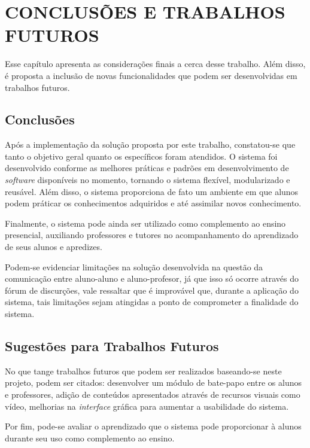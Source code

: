 \chapter{CONCLUSÕES E TRABALHOS FUTUROS}
\label{chap:conclusoes-e-trabalhos-futuros}

Esse capítulo apresenta as considerações finais a cerca desse trabalho. Além disso, é proposta a inclusão de novas funcionalidades que podem ser desenvolvidas em trabalhos futuros.

\section{Conclusões}

Após a implementação da solução proposta por este trabalho, constatou-se que tanto o objetivo geral quanto os específicos foram atendidos. O sistema foi desenvolvido conforme as melhores práticas e padrões em desenvolvimento de \textit{software} disponíveis no momento, tornando o sistema flexível, modularizado e reusável. Além disso, o sistema proporciona de fato um ambiente em que alunos podem práticar os conhecimentos adquiridos e até assimilar novos conhecimento. 

Finalmente, o sistema pode ainda ser utilizado como complemento ao ensino presencial, auxiliando professores e tutores no acompanhamento do aprendizado de seus alunos e apredizes.

Podem-se evidenciar limitações na solução desenvolvida na questão da comunicação entre aluno-aluno e aluno-profesor, já que isso só ocorre através do fórum de discurções, vale ressaltar que é improvável que, durante a aplicação do sistema, tais limitações sejam atingidas a ponto de comprometer a finalidade do sistema.

\section{Sugestões para Trabalhos Futuros}

No que tange trabalhos futuros que podem ser realizados baseando-se neste projeto, podem ser citados: desenvolver um módulo de bate-papo entre os alunos e professores, adição de conteúdos apresentados através de recursos visuais como vídeo, melhorias na \textit{interface} gráfica para aumentar a usabilidade do sistema. 

Por fim, pode-se avaliar o aprendizado que o sistema pode proporcionar à alunos durante seu uso como complemento ao ensino.



